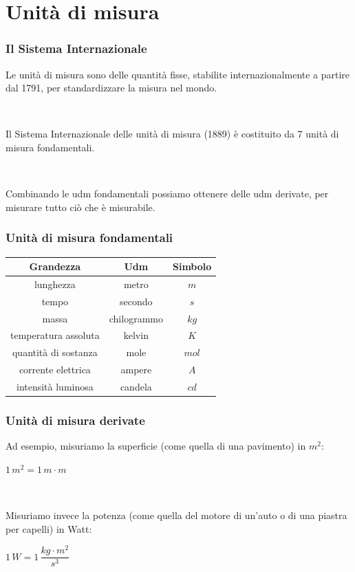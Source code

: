 \documentclass[handout]{beamer}
\theoremstyle{plain}
\begin{document}
\section{Unità di misura}


\begin{frame}
\frametitle{Il Sistema Internazionale}
Le unità di misura sono delle quantità fisse, stabilite internazionalmente a partire dal 1791, per \alert{standardizzare la misura} nel mondo.\pause

~

Il \alert{Sistema Internazionale} delle unità di misura (1889) è costituito da \alert{7 unità di misura fondamentali}.\pause

~

\alert{Combinando le udm fondamentali possiamo ottenere delle udm derivate}, per misurare tutto ciò che è misurabile.
\end{frame}


\begin{frame}
\frametitle{Unità di misura fondamentali}
\begin{table}[htp]\centering
  \begin{tabular}{ccc}\hline\rule{0pt}{3ex}
        \textbf{Grandezza}    & \textbf{Udm}  & \textbf{Simbolo}\\\hline\rule{0pt}{3ex}
        lunghezza             & metro         & $ m $\\\hline\rule{0pt}{3ex}
        tempo                 & secondo       & $ s $\\\hline\rule{0pt}{3ex}
        massa                 & chilogrammo   & $ kg $ \\\hline\rule{0pt}{3ex}
        temperatura assoluta  & kelvin        & $ K $\\\hline\rule{0pt}{3ex}
        quantità di sostanza  & mole          & $ mol $\\\hline\rule{0pt}{3ex}
        corrente elettrica    & ampere        & $ A $\\\hline\rule{0pt}{3ex}
        intensità luminosa    & candela       & $ cd $\\\hline
  \end{tabular}
\end{table}
\end{frame}




\begin{frame}
\frametitle{Unità di misura derivate}
Ad esempio, misuriamo \alert{la superficie} (come quella di una pavimento) \alert{in $ m^2 $}:
\begin{center}
$ 1 \, m^2 = 1 \, m \cdot m $
\end{center}\pause

~

Misuriamo invece \alert{la potenza} (come quella del motore di un'auto o di una piastra per capelli) \alert{in Watt}:
\begin{center}
$ 1 \, W = 1 \, \dfrac{kg \cdot m^2}{s^3} $
\end{center}
\end{frame}
\end{document}
